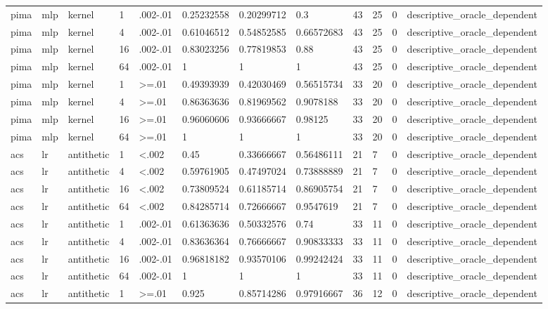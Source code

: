 \begin{tabular}{llllllllllll}
pima & mlp & kernel & 1 & .002-.01 & 0.25232558 & 0.20299712 & 0.3 & 43 & 25 & 0 & descriptive\_oracle\_dependent \\
pima & mlp & kernel & 4 & .002-.01 & 0.61046512 & 0.54852585 & 0.66572683 & 43 & 25 & 0 & descriptive\_oracle\_dependent \\
pima & mlp & kernel & 16 & .002-.01 & 0.83023256 & 0.77819853 & 0.88 & 43 & 25 & 0 & descriptive\_oracle\_dependent \\
pima & mlp & kernel & 64 & .002-.01 & 1 & 1 & 1 & 43 & 25 & 0 & descriptive\_oracle\_dependent \\
pima & mlp & kernel & 1 & >=.01 & 0.49393939 & 0.42030469 & 0.56515734 & 33 & 20 & 0 & descriptive\_oracle\_dependent \\
pima & mlp & kernel & 4 & >=.01 & 0.86363636 & 0.81969562 & 0.9078188 & 33 & 20 & 0 & descriptive\_oracle\_dependent \\
pima & mlp & kernel & 16 & >=.01 & 0.96060606 & 0.93666667 & 0.98125 & 33 & 20 & 0 & descriptive\_oracle\_dependent \\
pima & mlp & kernel & 64 & >=.01 & 1 & 1 & 1 & 33 & 20 & 0 & descriptive\_oracle\_dependent \\
acs & lr & antithetic & 1 & <.002 & 0.45 & 0.33666667 & 0.56486111 & 21 & 7 & 0 & descriptive\_oracle\_dependent \\
acs & lr & antithetic & 4 & <.002 & 0.59761905 & 0.47497024 & 0.73888889 & 21 & 7 & 0 & descriptive\_oracle\_dependent \\
acs & lr & antithetic & 16 & <.002 & 0.73809524 & 0.61185714 & 0.86905754 & 21 & 7 & 0 & descriptive\_oracle\_dependent \\
acs & lr & antithetic & 64 & <.002 & 0.84285714 & 0.72666667 & 0.9547619 & 21 & 7 & 0 & descriptive\_oracle\_dependent \\
acs & lr & antithetic & 1 & .002-.01 & 0.61363636 & 0.50332576 & 0.74 & 33 & 11 & 0 & descriptive\_oracle\_dependent \\
acs & lr & antithetic & 4 & .002-.01 & 0.83636364 & 0.76666667 & 0.90833333 & 33 & 11 & 0 & descriptive\_oracle\_dependent \\
acs & lr & antithetic & 16 & .002-.01 & 0.96818182 & 0.93570106 & 0.99242424 & 33 & 11 & 0 & descriptive\_oracle\_dependent \\
acs & lr & antithetic & 64 & .002-.01 & 1 & 1 & 1 & 33 & 11 & 0 & descriptive\_oracle\_dependent \\
acs & lr & antithetic & 1 & >=.01 & 0.925 & 0.85714286 & 0.97916667 & 36 & 12 & 0 & descriptive\_oracle\_dependent \\

\end{tabular}
